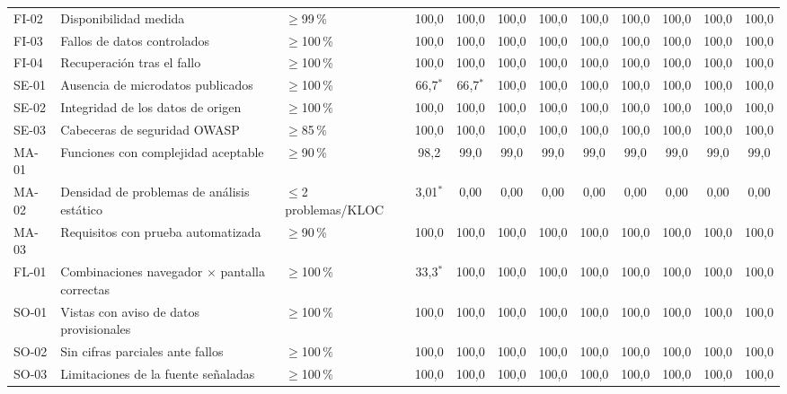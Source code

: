 \documentclass[conference,a4paper]{IEEEtran}
\begin{document}
\begin{table}[t]
\begin{tabular}{@{}lL{4.8cm}lccccccccc@{}}
FI-02 & Disponibilidad medida & $\geq$99\,\% & 100{,}0 & 100{,}0 & 100{,}0 & 100{,}0 & 100{,}0 & 100{,}0 & 100{,}0 & 100{,}0 & 100{,}0 \\
FI-03 & Fallos de datos controlados & $\geq$100\,\% & 100{,}0 & 100{,}0 & 100{,}0 & 100{,}0 & 100{,}0 & 100{,}0 & 100{,}0 & 100{,}0 & 100{,}0 \\
FI-04 & Recuperación tras el fallo & $\geq$100\,\% & 100{,}0 & 100{,}0 & 100{,}0 & 100{,}0 & 100{,}0 & 100{,}0 & 100{,}0 & 100{,}0 & 100{,}0 \\
SE-01 & Ausencia de microdatos publicados & $\geq$100\,\% & 66{,}7$^{\ast}$ & 66{,}7$^{\ast}$ & 100{,}0 & 100{,}0 & 100{,}0 & 100{,}0 & 100{,}0 & 100{,}0 & 100{,}0 \\
SE-02 & Integridad de los datos de origen & $\geq$100\,\% & 100{,}0 & 100{,}0 & 100{,}0 & 100{,}0 & 100{,}0 & 100{,}0 & 100{,}0 & 100{,}0 & 100{,}0 \\
SE-03 & Cabeceras de seguridad OWASP & $\geq$85\,\% & 100{,}0 & 100{,}0 & 100{,}0 & 100{,}0 & 100{,}0 & 100{,}0 & 100{,}0 & 100{,}0 & 100{,}0 \\
MA-01 & Funciones con complejidad aceptable & $\geq$90\,\% & 98{,}2 & 99{,}0 & 99{,}0 & 99{,}0 & 99{,}0 & 99{,}0 & 99{,}0 & 99{,}0 & 99{,}0 \\
MA-02 & Densidad de problemas de análisis estático & $\leq$2\,problemas/KLOC & 3{,}01$^{\ast}$ & 0{,}00 & 0{,}00 & 0{,}00 & 0{,}00 & 0{,}00 & 0{,}00 & 0{,}00 & 0{,}00 \\
MA-03 & Requisitos con prueba automatizada & $\geq$90\,\% & 100{,}0 & 100{,}0 & 100{,}0 & 100{,}0 & 100{,}0 & 100{,}0 & 100{,}0 & 100{,}0 & 100{,}0 \\
FL-01 & Combinaciones navegador $\times$ pantalla correctas & $\geq$100\,\% & 33{,}3$^{\ast}$ & 100{,}0 & 100{,}0 & 100{,}0 & 100{,}0 & 100{,}0 & 100{,}0 & 100{,}0 & 100{,}0 \\
SO-01 & Vistas con aviso de datos provisionales & $\geq$100\,\% & 100{,}0 & 100{,}0 & 100{,}0 & 100{,}0 & 100{,}0 & 100{,}0 & 100{,}0 & 100{,}0 & 100{,}0 \\
SO-02 & Sin cifras parciales ante fallos & $\geq$100\,\% & 100{,}0 & 100{,}0 & 100{,}0 & 100{,}0 & 100{,}0 & 100{,}0 & 100{,}0 & 100{,}0 & 100{,}0 \\
SO-03 & Limitaciones de la fuente señaladas & $\geq$100\,\% & 100{,}0 & 100{,}0 & 100{,}0 & 100{,}0 & 100{,}0 & 100{,}0 & 100{,}0 & 100{,}0 & 100{,}0 \\
\bottomrule
\end{tabular}
\end{table}
\end{document}
